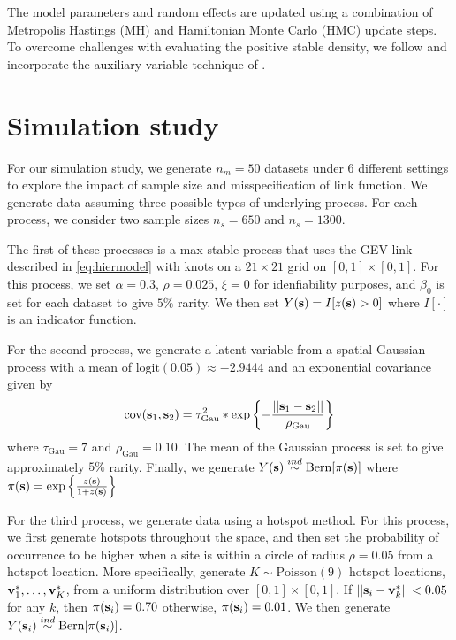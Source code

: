 The model parameters and random effects are updated using a combination of Metropolis Hastings (MH) and Hamiltonian Monte Carlo (HMC) update steps.
To overcome challenges with evaluating the positive stable density, we follow \citet{Reich2012} and incorporate the auxiliary variable technique of \citet{Stephenson2009}.


\section{Simulation study}\label{s:sim}

For our simulation study, we generate $n_m = 50$ datasets under 6 different settings to explore the impact of sample size and misspecification of link function.
We generate data assuming three possible types of underlying process.
For each process, we consider two sample sizes $n_s = 650$ and $n_s = 1300$.

The first of these processes is a max-stable process that uses the GEV link described in \ref{eq:hiermodel} with knots on a $21 \times 21$ grid on $[0, 1] \times [0, 1]$.
For this process, we set $\alpha = 0.3$, $\rho = 0.025$, $\xi = 0$ for idenfiability purposes, and $\beta_0$ is set for each dataset to give $5\%$ rarity.
We then set $Y(\mathbf{s}) = I[z(\mathbf{s}) > 0]$ where $I[\cdot]$ is an indicator function.

For the second process, we generate a latent variable from a spatial Gaussian process with a mean of $\text{logit}(0.05) \approx -2.9444$ and an exponential covariance given by
\begin{align}
  \text{cov}(\mathbf{s}_1, \mathbf{s}_2) = \tau_\text{Gau}^2 * \exp\left\{- \frac{||\mathbf{s}_1 - \mathbf{s}_2||}{\rho_\text{Gau}}\right\}
\end{align}
where $\tau_\text{Gau} = 7$ and $\rho_\text{Gau} = 0.10$.
The mean of the Gaussian process is set to give approximately $5\%$ rarity.
Finally, we generate $Y(\mathbf{s}) \stackrel{ind}{\sim} \text{Bern}[\pi(\mathbf{s})]$
where $\pi(\mathbf{s}) = \exp\left\{ \frac{z(\mathbf{s})}{1 + z(\mathbf{s})} \right\}$

For the third process, we generate data using a hotspot method.
For this process, we first generate hotspots throughout the space, and then set the probability of occurrence to be higher when a site is within a circle of radius $\rho = 0.05$ from a hotspot location.
More specifically, generate $K \sim \text{Poisson}(9)$ hotspot locations, $\mathbf{v}^*_1, \ldots, \mathbf{v}^*_K$, from a uniform distribution over $[0, 1] \times [0, 1]$.
If $||\mathbf{s}_i - \mathbf{v}^*_k|| < 0.05$ for any $k$, then $\pi(\mathbf{s}_i) = 0.70$ otherwise, $\pi(\mathbf{s}_i) = 0.01$.
We then generate $Y(\mathbf{s}_i) \stackrel{ind}{\sim} \text{Bern}[\pi(\mathbf{s}_i)]$.

